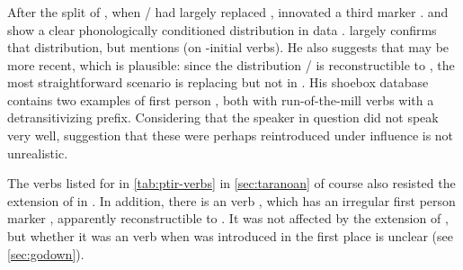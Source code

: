 \subsubsection{\akuriyo {}}
\label{sec:akuriyo}
After the split of \PTir, when \slash{} had largely replaced , \akuriyo innovated a third  marker .
 and  show a clear phonologically conditioned distribution in  \akuriyo data .
\textcite[107]{meira1998proto} largely confirms that distribution, but mentions  (on -initial verbs).
He also suggests that  may be more recent, which is plausible: since the distribution  /  is reconstructible to \PTir, the most straightforward scenario is  replacing  but not  in \akuriyo.
His shoebox database \parencite{meiraDBakuriyo} contains two examples of first person , both with run-of-the-mill  verbs with a detransitivizing prefix.
Considering that the speaker in question did not speak \akuriyo very well,  suggestion that these were perhaps reintroduced under \trio influence is not unrealistic.




The verbs listed for \PTir in \cref{tab:ptir-verbs} in \cref{sec:taranoan} of course also resisted the extension of  in \akuriyo.
In addition, there is an  verb  , which has an irregular first person marker , apparently reconstructible to \PTir {}.
It was not affected by the extension of \akuriyo {}, but whether it was an  verb when \PTir {} was introduced in the first place is unclear (see \cref{sec:godown}).


